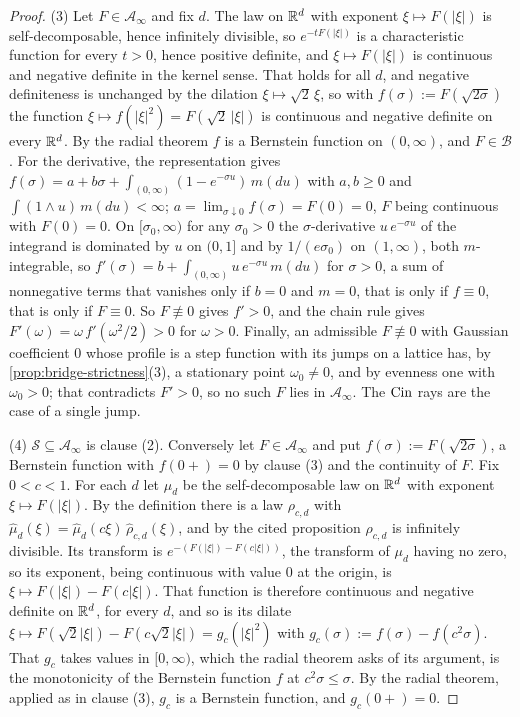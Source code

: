 \begin{proof}
(3) Let $F \in \mathcal{A}_\infty$ and fix $d$. The law on $\mathbb{R}^d$ with exponent
$\xi \mapsto F(|\xi|)$ is self-decomposable, hence infinitely divisible, so $e^{-tF(|\xi|)}$ is
a characteristic function for every $t > 0$, hence positive definite, and $\xi \mapsto F(|\xi|)$
is continuous and negative definite in the kernel sense. That holds for all $d$, and negative
definiteness is unchanged by the dilation $\xi \mapsto \sqrt2\,\xi$, so with
$f(\sigma) := F(\sqrt{2\sigma})$ the function $\xi \mapsto f(|\xi|^2) = F(\sqrt2\,|\xi|)$ is
continuous and negative definite on every $\mathbb{R}^d$. By the radial
theorem $f$ is a Bernstein function on $(0,\infty)$, and
$F \in \mathcal{B}$. For the derivative, the representation gives
$f(\sigma) = a + b\sigma + \int_{(0,\infty)}(1 - e^{-\sigma u})\,m(du)$ with $a, b \ge 0$ and
$\int (1 \wedge u)\,m(du) < \infty$; $a = \lim_{\sigma \downarrow 0} f(\sigma) = F(0) = 0$, $F$
being continuous with $F(0) = 0$. On $[\sigma_0,\infty)$ for any $\sigma_0 > 0$ the
$\sigma$-derivative $u\,e^{-\sigma u}$ of the integrand is dominated by $u$ on $(0,1]$ and by
$1/(e\sigma_0)$ on $(1,\infty)$, both $m$-integrable, so
$f'(\sigma) = b + \int_{(0,\infty)} u\,e^{-\sigma u}\,m(du)$ for $\sigma > 0$, a sum of
nonnegative terms that vanishes only if $b = 0$ and $m = 0$, that is only if $f \equiv 0$, that is
only if $F \equiv 0$. So $F \not\equiv 0$ gives $f' > 0$, and the chain rule gives
$F'(\omega) = \omega\,f'(\omega^2/2) > 0$ for $\omega > 0$. Finally, an admissible $F \not\equiv 0$
with Gaussian coefficient $0$ whose profile is a step function with its jumps on a lattice has, by
\ref{prop:bridge-strictness}(3), a stationary point $\omega_0 \ne 0$, and by evenness one with
$\omega_0 > 0$; that contradicts $F' > 0$, so no such $F$ lies in $\mathcal{A}_\infty$. The
$\operatorname{Cin}$ rays are the case of a single jump.

(4) $\mathcal{S} \subseteq \mathcal{A}_\infty$ is clause (2). Conversely let
$F \in \mathcal{A}_\infty$ and put $f(\sigma) := F(\sqrt{2\sigma})$, a Bernstein function with
$f(0{+}) = 0$ by clause (3) and the continuity of $F$. Fix $0 < c < 1$. For each $d$ let $\mu_d$
be the self-decomposable law on $\mathbb{R}^d$ with exponent $\xi \mapsto F(|\xi|)$. By the definition
there is a law $\rho_{c,d}$ with $\hat\mu_d(\xi) = \hat\mu_d(c\xi)\,\hat\rho_{c,d}(\xi)$, and by
the cited proposition $\rho_{c,d}$ is infinitely divisible. Its transform is
$e^{-(F(|\xi|) - F(c|\xi|))}$, the transform of $\mu_d$ having no zero, so its exponent, being
continuous with value $0$ at the origin, is $\xi \mapsto F(|\xi|) - F(c|\xi|)$. That function
is therefore continuous and negative definite on $\mathbb{R}^d$, for every $d$, and so is its dilate
$\xi \mapsto F(\sqrt2|\xi|) - F(c\sqrt2|\xi|) = g_c(|\xi|^2)$ with
$g_c(\sigma) := f(\sigma) - f(c^2\sigma)$. That $g_c$ takes values in $[0,\infty)$, which the
radial theorem asks of its argument, is the monotonicity of the Bernstein function $f$ at
$c^2\sigma \le \sigma$. By the radial theorem, applied as in clause (3),
$g_c$ is a Bernstein function, and $g_c(0{+}) = 0$.


\end{proof}
